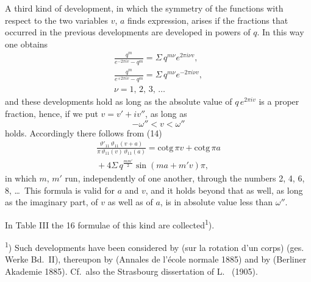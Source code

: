 A third kind of development, in which the symmetry of the
functions with respect to the two variables $v$, $a$ finds
expression, arises if the fractions that occurred in the previous
developments are developed in powers of $q$. In this way one
obtains
\[
\begin{gathered}
\frac{q^m}{e^{-2\pi i v}-q^m} = \Sigma\, q^{m\nu} e^{2\pi i \nu v}, \\
\frac{q^m}{e^{+2\pi i v}-q^m} = \Sigma\, q^{m\nu} e^{-2\pi i \nu v}, \\
\nu = 1,\, 2,\, 3,\, \ldots
\end{gathered}
\]
and these developments hold as long as the absolute value
of $q\, e^{2\pi i v}$ is a proper fraction, hence, if we put $v = v' + i v''$,
as long as
\[
-\omega'' < v < \omega'' %
\]
holds. Accordingly there follows from (14)
\[
\begin{gathered}
\frac{\vartheta'_{11}\,\vartheta_{11}(v+a)}{\pi\,\vartheta_{11}(v)\,\vartheta_{11}(a)} = \mathrm{cotg}\,\pi v + \mathrm{cotg}\,\pi a \\
{}+ 4\Sigma\, q^{\frac{mm'}{2}} \sin(m a + m' v)\pi,
\end{gathered}
\]
in which $m$, $m'$ run, independently of one another, through the  numbers
2, 4, 6, 8, \ldots\ This formula is valid for 
$a$ and $v$, and it holds beyond that as well, as long as the imaginary
part, of $v$ as well as of $a$, is in absolute value less than $\omega''$.

In Table III the 16 formulae of this kind are collected\textsuperscript{1}).

\textsuperscript{1}) Such developments have been considered by  (sur la rotation d'un corps)
(ges. Werke Bd.\ II), thereupon by  (Annales de l'école normale 1885)
and by  (Berliner Akademie 1885). Cf.\ also the
Strasbourg dissertation of L.\  (1905).
